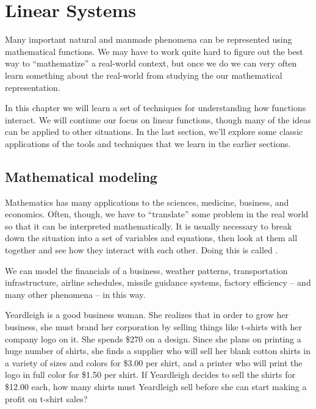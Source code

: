 \chapter{Linear Systems}
\label{ch:systems}


Many important natural and manmade phenomena can be represented using mathematical functions. We may have to work quite hard to figure out the best way to ``mathematize'' a real-world context, but once we do we can very often learn something about the real-world from studying the our mathematical representation.

In this chapter we will learn a set of techniques for understanding how functions interact. We will continue our focus on linear functions, though many of the ideas can be applied to other situations. In the last section, we'll explore some classic applications of the tools and techniques that we learn in the earlier sections.

\section{Mathematical modeling}
\label{sec:sysintro}

Mathematics has many applications to the sciences, medicine, business, and economics. Often, though, we have to ``translate'' some problem in the real world so that it can be interpreted mathematically. It is usually necessary to break down the situation into a set of variables and equations, then look at them all together and see how they interact with each other. Doing this is called .

We can model the financials of a business, weather patterns, transportation infrastructure, airline schedules, missile guidance systems, factory efficiency -- and many other phenomena -- in this way.

\begin{boxedexplore}
Yeardleigh is a good business woman. She realizes that in order to grow her business, she must brand her corporation by selling things like t-shirts with her company logo on it. She spends \$270 on a design. Since she plans on printing a huge number of shirts, she finds a supplier who will sell her blank cotton shirts in a variety of sizes and colors for \$3.00 per shirt, and a printer who will print the logo in full color for \$1.50 per shirt. If Yeardleigh decides to sell the shirts for \$12.00 each, how many shirts must Yeardleigh sell before she can start making a profit on t-shirt sales?
\end{boxedexplore}

